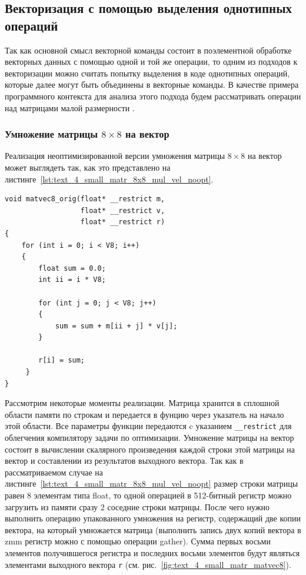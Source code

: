 \subsection{Векторизация с помощью выделения однотипных операций}

Так как основной смысл векторной команды состоит в поэлементной обработке векторных данных с помощью одной и той же операции, то одним из подходов к векторизации можно считать попытку выделения в коде однотипных операций, которые далее могут быть объединены в векторные команды.
В качестве примера программного контекста для анализа этого подхода будем рассматривать операции над матрицами малой размерности \cite{Bendersky2018VecMat2}.

\subsubsection{Умножение матрицы $8 \times 8$ на вектор}

Реализация неоптимизированной версии умножения матрицы $8 \times 8$ на вектор может выглядеть так, как это представлено на листинге~\ref{lst:text_4_small_matr_8x8_mul_vel_noopt}.

\begin{lstlisting}[caption={Невекторизованная версия умножения матрицы размера $8 \times 8$ на вектор},label={lst:text_4_small_matr_8x8_mul_vel_noopt}]
void matvec8_orig(float* __restrict m,
                  float* __restrict v,
                  float* __restrict r)
{
    for (int i = 0; i < V8; i++)
    {
        float sum = 0.0;
        int ii = i * V8;

        for (int j = 0; j < V8; j++)
        {
            sum = sum + m[ii + j] * v[j];
        }

        r[i] = sum;
     }
}
\end{lstlisting}

Рассмотрим некоторые моменты реализации.
Матрица хранится в сплошной области памяти по строкам и передается в фунцию через указатель на начало этой области.
Все параметры функции передаются c указанием \texttt{\_\_restrict} для облегчения компилятору задачи по оптимизации.
Умножение матрицы на вектор состоит в вычислении скалярного произведения каждой строки этой матрицы на вектор и составлении из результатов выходного вектора.
Так как в рассматриваемом случае на листинге~\ref{lst:text_4_small_matr_8x8_mul_vel_noopt} размер строки матрицы равен 8 элементам типа float, то одной операцией в 512-битный регистр можно загрузить из памяти сразу 2 соседние строки матрицы.
После чего нужно выполнить операцию упакованного умножения на регистр, содержащий две копии вектора, на который умножается матрица (выполнить запись двух копий вектора в zmm регистр можно с помощью операции gather).
Сумма первых восьми элементов получившегося регистра и последних восьми элементов будут являться элементами выходного вектора \texttt{r} (см. рис.~\ref{fig:text_4_small_matr_matvec8}).

